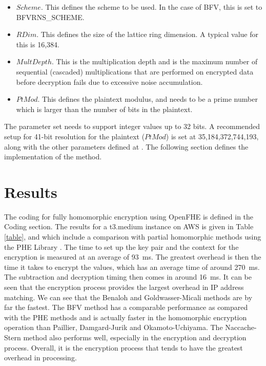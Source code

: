\documentclass[envcountsame,runningheads,notitlepage]{llncs}
\begin{document}
\begin{itemize}
    \item $Scheme$. This defines the scheme to be used. In the case of BFV, this is set to BFVRNS\_SCHEME.
    \item $RDim$. This defines the size of the lattice ring dimension. A typical value for this is 16,384.
    \item $MultDepth$. This is the multiplication depth and is the maximum number of sequential (cascaded) multiplications that are performed on encrypted data before decryption fails due to excessive noise accumulation. 
    \item $PtMod$. This defines the plaintext modulus, and needs to be a prime number which is larger than the number of bits in the plaintext. 
\end{itemize}

The parameter set needs to support integer values up to 32 bits. A recommended setup for 41-bit resolution for the plaintext ($PtMod$) is set at 35,184,372,744,193, along with the other parameters defined at \cite{openfhe_test}. The following section defines the implementation of the method.

\section{Results}
The coding for fully homomorphic encryption using OpenFHE is defined in the Coding section. The results for a t3.medium instance on AWS is given in Table \ref{table}, and which include a comparison with partial homomorphic methods using the PHE Library \cite{PHE}. The time to set up the key pair and the context for the encryption is measured at an average of 93~ms. The greatest overhead is then the time it takes to encrypt the values, which has an average time of around 270~ms. The subtraction and decryption timing then comes in around 16~ms. It can be seen that the encryption process provides the largest overhead in IP address matching. We can see that the Benaloh and Goldwasser-Micali methods are by far the fastest. The BFV method has a comparable performance as compared with the PHE methods and is actually faster in the homomorphic encryption operation than Paillier, Damgard-Jurik and Okamoto-Uchiyama. The Naccache-Stern method also performs well, especially in the encryption and decryption process. Overall, it is the encryption process that tends to have the greatest overhead in processing.
\end{document}
